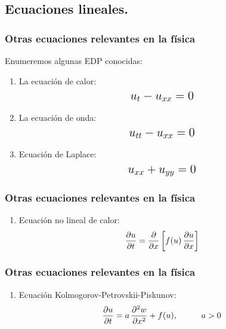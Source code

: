 \documentclass[12pt]{beamer}
\begin{document}
\subsection*{Ecuaciones lineales.}

\begin{frame}
\frametitle{Otras ecuaciones relevantes en la física}
Enumeremos algunas EDP conocidas:
\pause
{}
\begin{enumerate}[<+->]
\item La ecuación de calor:
\begin{align*}
\text{\Large{$u_{t} - u_{xx} = 0$}}
\end{align*}
\item La ecuación de onda:
\begin{align*}
\text{\Large{$u_{tt} - u_{xx} = 0$}}
\end{align*}
\item Ecuación de Laplace:
\begin{align*}
\text{\Large{$u_{xx} + u_{yy} = 0$}}
\end{align*}
\seti
\end{enumerate}
\end{frame}
\begin{frame}
\frametitle{Otras ecuaciones relevantes en la física}
\begin{enumerate}[<+->]
\conti
\item Ecuación no lineal de calor:
\begin{align*}
\pdv{u}{t} = \pdv{x} \left[ f(u) \, \pdv{u}{x} \right]
\end{align*}
\seti
\end{enumerate}
\end{frame}
\begin{frame}
\frametitle{Otras ecuaciones relevantes en la física}
\begin{enumerate}[<+->]
\conti
\item Ecuación Kolmogorov-Petrovskii-Piskunov:
\begin{align*}
\pdv{u}{t} = a \, \pdv[2]{w}{x} + f(u), \hspace{1cm} a > 0
\end{align*}
\seti
\end{enumerate}
\end{frame}
\end{document}
